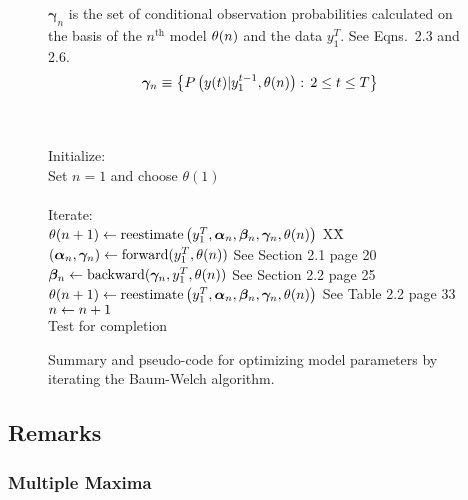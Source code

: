 \documentclass[prelim,showlabels]{book}
\newcommand{\parameters}{\theta}
\newcommand{\ti}[2]{{#1}{(#2)}}                  %
\newcommand{\ts}[3]{#1_{#2}^{#3}}                    %
\begin{document}
\begin{figure}[htbp]
\begin{center}
{\begin{minipage}{0.90\textwidth}
\begin{tabbing}
      \begin{minipage}[b]{1.0\textwidth}
         $\bm{\gamma}_n$ is the set of conditional observation probabilities
         calculated on the basis of the $n^{\text{th}}$ model $\oldmodel$ and
         the data $\ts{y}{1}{T}$.  See Eqns.~2.3 and 2.6.
         \begin{equation*}
         \bm{\gamma}_n \equiv \left\{P \left(\ti{y}{t} | \ts{y}{1}{t-1},
         \oldmodel\right) : \, 2 \leq t \leq T \right\}
         \end{equation*}
      \end{minipage}\\ \\%
      \<\-
      Initialize: \> \+ \\
      Set $n=1$ and choose $\ti{\parameters}{1}$\\ \\ \< \-
      Iterate: \> \+ \\
      $\newmodel \assign \text{reestimate} \left( \ts{y}{1}{T},
      \bm{\alpha}_n, \bm{\beta}_n, \bm{\gamma}_n, \oldmodel\right)$ XX\= \kill
      $\left(\bm{\alpha}_n,\bm{\gamma}_n\right) \assign
      \text{forward}(\ts{y}{1}{T},\oldmodel)$ \> See Section 2.1 page 20\\
      $\bm{\beta}_n \assign \text{backward}(\bm{\gamma}_n, \ts{y}{1}{T},
      \oldmodel)$ \> See Section 2.2 page 25\\
      $\newmodel \assign \text{reestimate} \left( \ts{y}{1}{T},
      \bm{\alpha}_n, \bm{\beta}_n, \bm{\gamma}_n, \oldmodel\right)$ \> See Table
      2.2 page 33 \\
      $n \leftarrow n+1$ \\
      Test for completion
    \end{tabbing}
  \end{minipage}
}
\caption[Baum-Welch model parameter optimization.]%
{Summary and pseudo-code for optimizing model parameters by iterating
  the Baum-Welch algorithm. }
    \label{fig:train}
  \end{center}
\end{figure}

\subsection{Remarks}
\label{sec:AlgApp}

\subsubsection{Multiple Maxima}
\label{sec:MultiMax}
\end{document}
